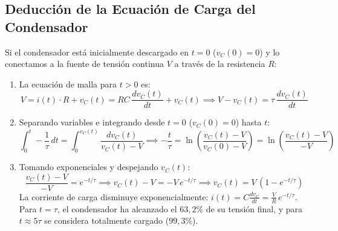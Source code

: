 \subsection{Deducción de la Ecuación de Carga del Condensador}
Si el condensador está inicialmente descargado en $t = 0$ ($v_C(0) = 0$) y lo conectamos a la fuente de tensión continua $V$ a través de la resistencia $R$:
\begin{enumerate}
    \item La ecuación de malla para $t > 0$ es:
    \begin{equation}
        V = i(t)\cdot R + v_C(t) = R C\,\frac{dv_C(t)}{dt} + v_C(t) \implies V - v_C(t) = \tau\,\frac{dv_C(t)}{dt}
    \end{equation}
    \item Separando variables e integrando desde $t = 0$ ($v_C(0) = 0$) hasta $t$:
    \begin{equation}
        \int_0^t -\frac{1}{\tau}\,dt = \int_0^{v_C(t)} \frac{dv_C(t)}{v_C(t) - V} \implies -\frac{t}{\tau} = \ln\left(\frac{v_C(t) - V}{v_C(0) - V}\right) = \ln\left(\frac{v_C(t) - V}{-V}\right)
    \end{equation}
    \item Tomando exponenciales y despejando $v_C(t)$:
    \begin{equation}
        \frac{v_C(t) - V}{-V} = e^{-t/\tau} \implies v_C(t) - V = -V\,e^{-t/\tau} \implies \boxed{v_C(t) = V\,\left(1 - e^{-t/\tau}\right)}
    \end{equation}
    La corriente de carga disminuye exponencialmente: $i(t) = C\frac{dv_C}{dt} = \frac{V}{R}\,e^{-t/\tau}$. Para $t = \tau$, el condensador ha alcanzado el $63{,}2\%$ de su tensión final, y para $t \approx 5\tau$ se considera totalmente cargado ($99{,}3\%$).
\end{enumerate}


